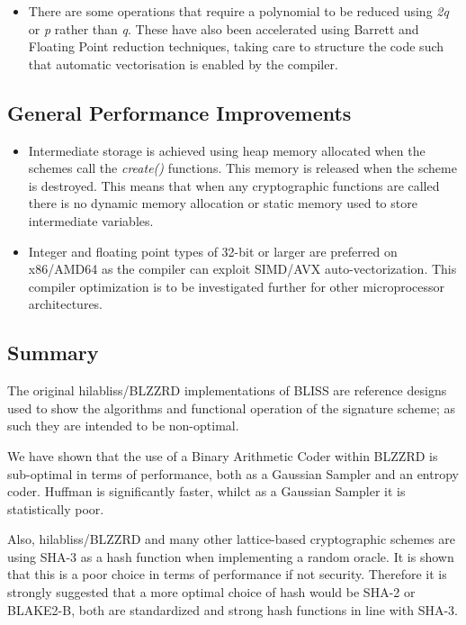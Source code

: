 \begin{itemize}
\item There are some operations that require a polynomial to be reduced using \textit{2q} or \textit{p} rather than \textit{q}. These have also been accelerated using Barrett and Floating Point reduction techniques, taking care to structure the code such that automatic vectorisation is enabled by the compiler.
\end{itemize}



\subsection{General Performance Improvements}

\begin{itemize}
\item Intermediate storage is achieved using heap memory allocated when the schemes call the \textit{create()} functions. This memory is released when the scheme is destroyed. This means that when any cryptographic functions are called there is no dynamic memory allocation or static memory used to store intermediate variables.
\item Integer and floating point types of 32-bit or larger are preferred on x86/AMD64 as the compiler can exploit SIMD/AVX auto-vectorization. This compiler optimization is to be investigated further for other microprocessor architectures.
\end{itemize}


\subsection{Summary}

The original hilabliss/BLZZRD implementations of BLISS are reference designs used to show the algorithms and functional operation of the signature scheme; as such they are intended to be non-optimal.

We have shown that the use of a Binary Arithmetic Coder within BLZZRD is sub-optimal in terms of performance, both as a Gaussian Sampler and an entropy coder. Huffman is significantly faster, whilct as a Gaussian Sampler it is statistically poor.

Also, hilabliss/BLZZRD and many other lattice-based cryptographic schemes are using SHA-3 as a hash function when implementing a random oracle. It is shown that this is a poor choice in terms of performance if not security. Therefore it is strongly suggested that a more optimal choice of hash would be SHA-2 or BLAKE2-B, both are standardized and strong hash functions in line with SHA-3.

